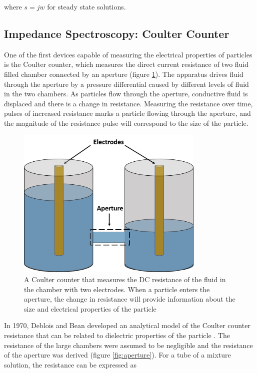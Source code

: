  \noindent where $s=jw$ for steady state solutions.

\subsection*{Impedance Spectroscopy: Coulter Counter}
\par One of the first devices capable of measuring the electrical properties of particles is the Coulter counter, which measures the direct current resistance of two fluid filled chamber connected by an aperture (figure \ref{fig:coulter_counter}). The apparatus drives fluid through the aperture by a pressure differential caused by different levels of fluid in the two chambers. As particles flow through the aperture, conductive fluid is displaced and there is a change in resistance. Measuring the resistance over time, pulses of increased resistance marks a particle flowing through the aperture, and the magnitude of the resistance pulse will correspond to the size of the particle. 


\begin{figure}[ht]
    \centering
    \includegraphics[width=0.8\textwidth]{images/coultierCounter.png}
    \caption[Illustration of Coulter counter principles]{A Coulter counter that measures the DC resistance of the fluid in the chamber with two electrodes. When a particle enters the aperture, the change in resistance will provide information about the size and electrical properties of the particle}
    \label{fig:coulter_counter}
\end{figure}


In 1970, Deblois and Bean developed an analytical model of the Coulter counter resistance that can be related to dielectric properties of the particle \cite{deblois_counting_1970}. The resistance of the large chambers were assumed to be negligible and the resistance of the aperture was derived (figure \ref{fig:aperture}). For a tube of a mixture solution, the resistance can be expressed as

